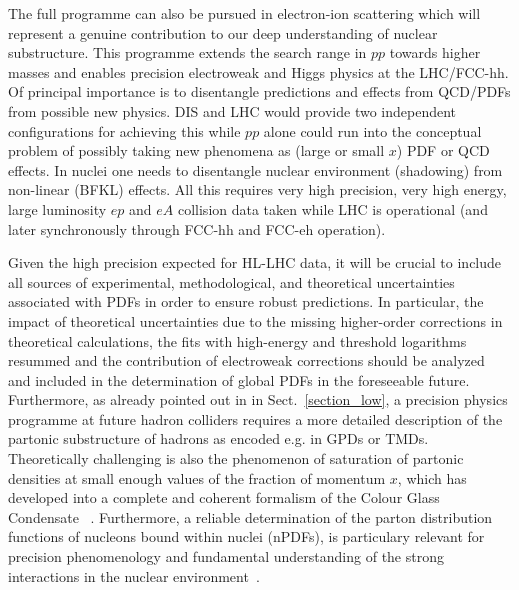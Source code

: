  The full programme can also be pursued in electron-ion scattering which will represent  a genuine contribution to our deep 
understanding of nuclear substructure. This programme
extends the search range in $pp$ towards higher masses and enables
precision electroweak and Higgs physics at the LHC/FCC-hh. Of principal
importance is to disentangle predictions and effects from QCD/PDFs from
possible new physics. DIS and LHC would provide two independent
configurations for achieving this while $pp$ alone could   run into the conceptual problem of possibly taking new phenomena as (large or small
$x$) PDF or QCD effects. In nuclei one needs to disentangle nuclear
environment (shadowing) from non-linear (BFKL) effects. All this
requires very high precision, very high energy, large luminosity $ep$ and
$eA$ collision data taken while LHC is operational (and later
synchronously through FCC-hh and FCC-eh operation). 

Given the high precision expected for HL-LHC data, it will be crucial to include all sources of experimental, methodological, and theoretical uncertainties associated with PDFs in order to ensure robust predictions. In particular,
the impact of theoretical uncertainties due to the missing higher-order corrections in theoretical calculations,  the fits with high-energy and threshold logarithms resummed and    the contribution of  electroweak corrections  should    be analyzed and included in the determination of  global PDFs in the foreseeable future. Furthermore, as already pointed out in in Sect.~\ref{section_low},  a  precision physics programme at future hadron colliders requires    a more detailed  description  of  
the partonic substructure of hadrons   as encoded  e.g. in GPDs or  TMDs. Theoretically challenging is also the phenomenon  of  saturation of partonic densities  at small enough values of  the  fraction  of  momentum $x$, which has  developed into a complete and coherent formalism of the Colour Glass Condensate ~\cite{Iancu:2002xk,Petreska:2018cbf,Altinoluk:2019fui}. Furthermore,  a reliable determination     of the parton distribution functions of nucleons bound within nuclei (nPDFs),  is particulary relevant for precision phenomenology and   fundamental understanding of the strong interactions in the nuclear environment~\cite{Kusina:2017gkz,AbdulKhalek:2019mzd}.




